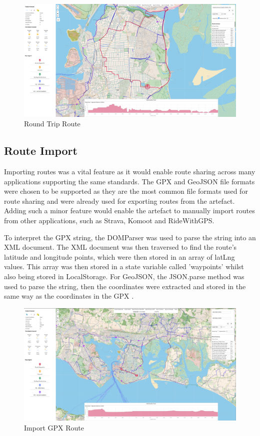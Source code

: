 \begin{figure}[!ht]
  \centering
  \includegraphics[width=425px]{figures/Progress Images/Iteration-3/SR11/SR11- Round Trip functionality working.png}
  \caption{Round Trip Route}
  \label{fig:round-trip}
\end{figure}

\subsection{Route Import}
\label{iteration3:route-import}

Importing routes was a vital feature as it would enable route sharing across many applications supporting the same standards. The GPX and GeoJSON file formats were chosen to be supported as they are the most common file formats used for route sharing and were already used for exporting routes from the artefact. Adding such a minor feature would enable the artefact to manually import routes from other applications, such as Strava, Komoot and RideWithGPS.

To interpret the GPX string, the DOMParser was used to parse the string into an XML document. The XML document was then traversed to find the route's latitude and longitude points, which were then stored in an array of latLng values. This array was then stored in a state variable called 'waypoints' whilst also being stored in LocalStorage. For GeoJSON, the JSON.parse method was used to parse the string, then the coordinates were extracted and stored in the same way as the coordinates in the GPX .

\begin{figure}[!ht]
  \centering
  \includegraphics[width=425px]{figures/Progress Images/Iteration-3/SR48-49/SR48-Import GPX.png}
  \caption{Import GPX Route}
  \label{fig:gpx-import}
\end{figure}

